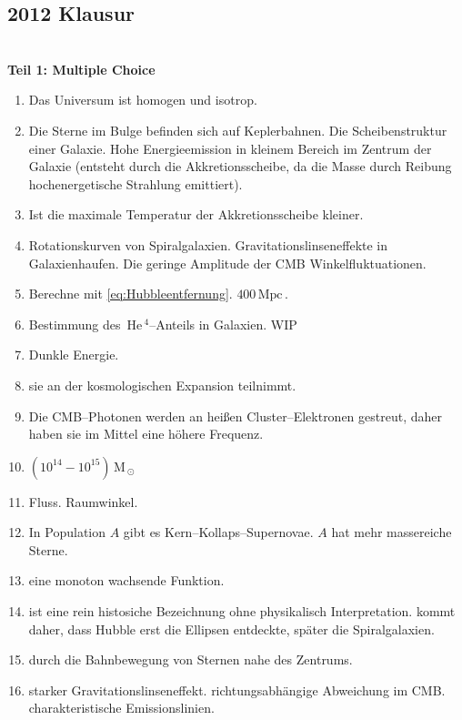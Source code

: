 \documentclass[a4paper,12pt]{article}
\numberwithin{equation}{section}
\begin{document}

\newpage


\subsection{2012 Klausur}
\hfill\\\textbf{Teil 1: Multiple Choice}
\begin{enumerate}[label=\arabic*.]
        \item Das Universum ist homogen und isotrop.
        \item Die Sterne im Bulge befinden sich auf Keplerbahnen. Die Scheibenstruktur einer Galaxie. Hohe Energieemission in kleinem Bereich im Zentrum der Galaxie (entsteht durch die Akkretionsscheibe, da die Masse durch Reibung hochenergetische Strahlung emittiert).
        \item Ist die maximale Temperatur der Akkretionsscheibe kleiner. 
        \item Rotationskurven von Spiralgalaxien. Gravitationslinseneffekte in Galaxienhaufen. Die geringe Amplitude der CMB Winkelfluktuationen.
        \item Berechne mit \eqref{eq:Hubbleentfernung}. $400\,\text{Mpc}\,$.
        \item Bestimmung des $\,\text{He}\,^4$--Anteils in Galaxien. WIP
        \item Dunkle Energie.
        \item sie an der kosmologischen Expansion teilnimmt.
        \item Die CMB--Photonen werden an heißen Cluster--Elektronen gestreut, daher haben sie im Mittel eine höhere Frequenz.
        \item $\left(10^{14}-10^{15}\right)\,\text{M}\,_\odot$ 
        \item Fluss. Raumwinkel.
        \item In Population $A$ gibt es Kern--Kollaps--Supernovae. $A$ hat mehr massereiche Sterne.
        \item eine monoton wachsende Funktion.
        \item ist eine rein histosiche Bezeichnung ohne physikalisch Interpretation. kommt daher, dass Hubble erst die Ellipsen entdeckte, später die Spiralgalaxien.
        \item durch die Bahnbewegung von Sternen nahe des Zentrums.
        \item starker Gravitationslinseneffekt. richtungsabhängige Abweichung im CMB. charakteristische Emissionslinien.

\end{enumerate}
\end{document}
